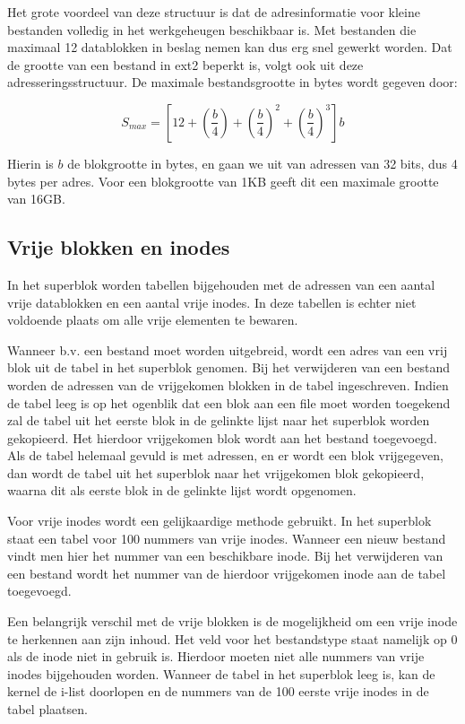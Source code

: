 Het grote voordeel van deze structuur is dat de adresinformatie voor kleine bestanden volledig in het werkgeheugen
beschikbaar is. Met bestanden die maximaal 12 datablokken in beslag nemen kan dus erg snel gewerkt worden. Dat de
grootte van een bestand in ext2 beperkt is, volgt ook uit deze adresseringsstructuur. De maximale bestandsgrootte
in bytes wordt gegeven door:

\begin{displaymath}
S_{max} = \left[12 + \left(\frac{b}{4}\right) + \left(\frac{b}{4}\right)^{2} + \left(\frac{b}{4}\right)^{3}\right]b
\end{displaymath}

Hierin is $b$ de blokgrootte in bytes, en gaan we uit van adressen van 32 bits, dus 4 bytes per adres. Voor een
blokgrootte van 1KB geeft dit een maximale grootte van 16GB.

\subsection{Vrije blokken en inodes}

In het superblok worden tabellen bijgehouden met de adressen van een aantal vrije datablokken en een aantal vrije
inodes. In deze tabellen is echter niet voldoende plaats om alle vrije elementen te bewaren.

Wanneer b.v. een bestand moet worden uitgebreid, wordt een adres van een vrij blok uit de tabel in het superblok
genomen. Bij het verwijderen van een bestand worden de adressen van de vrijgekomen blokken in de tabel ingeschreven.
Indien de tabel leeg is op het ogenblik dat een blok aan een file moet worden toegekend zal de tabel uit het eerste
blok in de gelinkte lijst naar het superblok worden gekopieerd. Het hierdoor vrijgekomen blok wordt aan het bestand
toegevoegd. Als de tabel helemaal gevuld is met adressen, en er wordt een blok vrijgegeven, dan wordt de tabel uit
het superblok naar het vrijgekomen blok gekopieerd, waarna dit als eerste blok in de gelinkte lijst wordt opgenomen.

Voor vrije inodes wordt een gelijkaardige methode gebruikt. In het superblok staat een tabel voor 100 nummers van
vrije inodes.  Wanneer een nieuw bestand vindt men hier het nummer van een beschikbare inode. Bij het verwijderen
van een bestand wordt het nummer van de hierdoor vrijgekomen inode aan de tabel toegevoegd.

Een belangrijk verschil met de vrije blokken is de mogelijkheid om een vrije inode te herkennen aan zijn inhoud. Het
veld voor het bestandstype staat namelijk op 0 als de inode niet in gebruik is. Hierdoor moeten niet alle nummers van
vrije inodes bijgehouden worden. Wanneer de tabel in het superblok leeg is, kan de kernel de i-list doorlopen en de
nummers van de 100 eerste vrije inodes in de tabel plaatsen.

